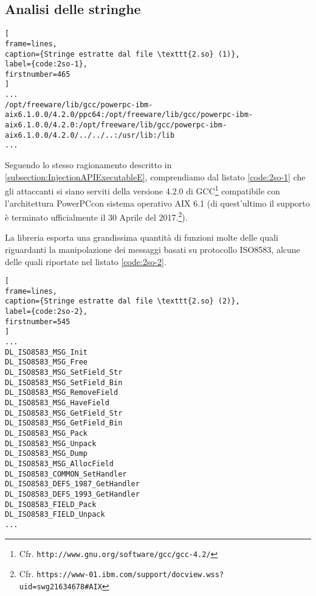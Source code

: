 \documentclass[10pt,a4paper, titlepage]{report}
\begin{document}
\subsection{Analisi delle stringhe}\label{strings2so}

\begin{lstlisting}[
frame=lines, 
caption={Stringe estratte dal file \texttt{2.so} (1)}, 
label={code:2so-1},
firstnumber=465
]
...
/opt/freeware/lib/gcc/powerpc-ibm-aix6.1.0.0/4.2.0/ppc64:/opt/freeware/lib/gcc/powerpc-ibm-aix6.1.0.0/4.2.0:/opt/freeware/lib/gcc/powerpc-ibm-aix6.1.0.0/4.2.0/../../..:/usr/lib:/lib
...
\end{lstlisting}

Seguendo lo stesso ragionamento descritto in \ref{subsection:InjectionAPIExecutableE}, comprendiamo dal listato \ref{code:2so-1} che gli attaccanti si siano serviti della versione 4.2.0 di GCC\footnote{Cfr. \texttt{http://www.gnu.org/software/gcc/gcc-4.2/}} compatibile con l'architettura PowerPC\texttrademark con sistema operativo AIX 6.1 (di quest'ultimo il supporto è terminato ufficialmente il 30 Aprile del 2017.\footnote{Cfr. \texttt{https://www-01.ibm.com/support/docview.wss?uid=swg21634678\#AIX}}).

La libreria esporta una grandissima quantità di funzioni molte delle quali riguardanti la manipolazione dei messaggi basati su protocollo ISO8583, alcune delle quali riportate nel listato \ref{code:2so-2}.

\begin{lstlisting}[
frame=lines, 
caption={Stringe estratte dal file \texttt{2.so} (2)}, 
label={code:2so-2},
firstnumber=545
]
...
DL_ISO8583_MSG_Init
DL_ISO8583_MSG_Free
DL_ISO8583_MSG_SetField_Str
DL_ISO8583_MSG_SetField_Bin
DL_ISO8583_MSG_RemoveField
DL_ISO8583_MSG_HaveField
DL_ISO8583_MSG_GetField_Str
DL_ISO8583_MSG_GetField_Bin
DL_ISO8583_MSG_Pack
DL_ISO8583_MSG_Unpack
DL_ISO8583_MSG_Dump
DL_ISO8583_MSG_AllocField
DL_ISO8583_COMMON_SetHandler
DL_ISO8583_DEFS_1987_GetHandler
DL_ISO8583_DEFS_1993_GetHandler
DL_ISO8583_FIELD_Pack
DL_ISO8583_FIELD_Unpack
...
\end{lstlisting}
\end{document}
